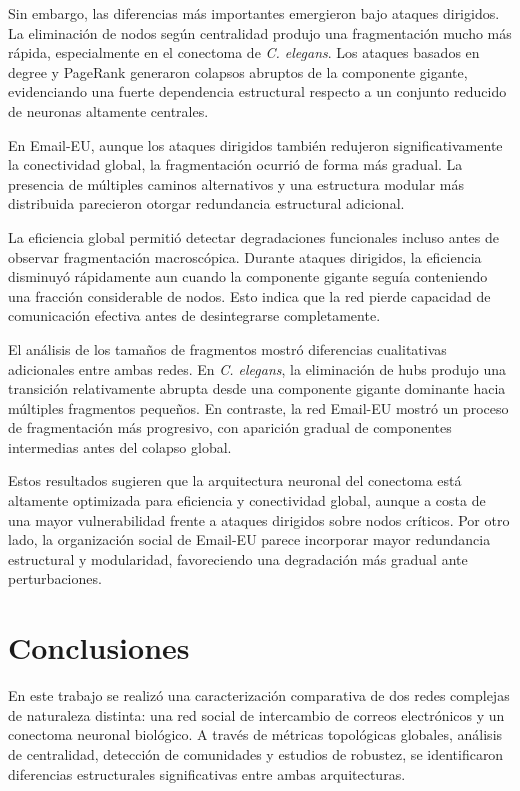 Sin embargo, las diferencias más importantes emergieron bajo ataques dirigidos. La eliminación de nodos según centralidad produjo una fragmentación mucho más rápida, especialmente en el conectoma de \textit{C. elegans}. Los ataques basados en degree y PageRank generaron colapsos abruptos de la componente gigante, evidenciando una fuerte dependencia estructural respecto a un conjunto reducido de neuronas altamente centrales.

En Email-EU, aunque los ataques dirigidos también redujeron significativamente la conectividad global, la fragmentación ocurrió de forma más gradual. La presencia de múltiples caminos alternativos y una estructura modular más distribuida parecieron otorgar redundancia estructural adicional.

La eficiencia global permitió detectar degradaciones funcionales incluso antes de observar fragmentación macroscópica. Durante ataques dirigidos, la eficiencia disminuyó rápidamente aun cuando la componente gigante seguía conteniendo una fracción considerable de nodos. Esto indica que la red pierde capacidad de comunicación efectiva antes de desintegrarse completamente.

El análisis de los tamaños de fragmentos mostró diferencias cualitativas adicionales entre ambas redes. En \textit{C. elegans}, la eliminación de hubs produjo una transición relativamente abrupta desde una componente gigante dominante hacia múltiples fragmentos pequeños. En contraste, la red Email-EU mostró un proceso de fragmentación más progresivo, con aparición gradual de componentes intermedias antes del colapso global.

Estos resultados sugieren que la arquitectura neuronal del conectoma está altamente optimizada para eficiencia y conectividad global, aunque a costa de una mayor vulnerabilidad frente a ataques dirigidos sobre nodos críticos. Por otro lado, la organización social de Email-EU parece incorporar mayor redundancia estructural y modularidad, favoreciendo una degradación más gradual ante perturbaciones.

\section{Conclusiones}

En este trabajo se realizó una caracterización comparativa de dos redes complejas de naturaleza distinta: una red social de intercambio de correos electrónicos y un conectoma neuronal biológico. A través de métricas topológicas globales, análisis de centralidad, detección de comunidades y estudios de robustez, se identificaron diferencias estructurales significativas entre ambas arquitecturas.

